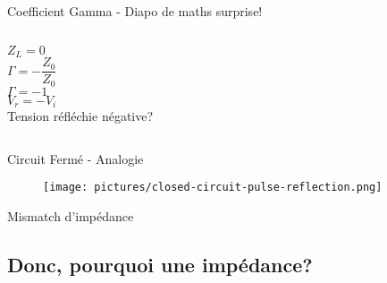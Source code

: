 \begin{frame}{Coefficient Gamma - Diapo de maths surprise!}
\begin{columns}
\begin{column}{0.33\textwidth}
            \begin{center}
                $Z_L = 0$\\
                \vspace{10pt}
                $\Gamma = -\dfrac{Z_0}{Z_0}$\\
                \vspace{10pt}
                $\Gamma = -1$\\
                \vspace{5pt}
                $V_r = -V_i$\\
                \vspace{5pt}
                Tension réfléchie négative?
            \end{center}
        \end{column}
    \end{columns}
\end{frame}


\begin{frame}{Circuit Fermé - Analogie}
    \begin{figure}
        \centering
        \texttt{[image: pictures/closed-circuit-pulse-reflection.png]}
    \end{figure}
\end{frame}

\begin{frame}{Mismatch d'impédance}
\end{frame}

\subsection{Donc, pourquoi une impédance?}